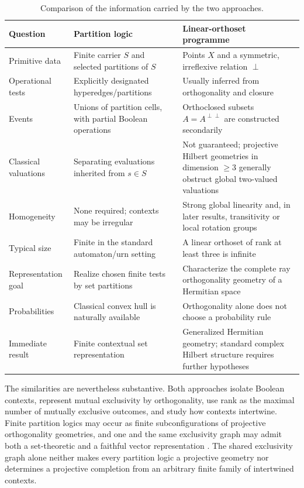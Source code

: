 \documentclass[
  aps,
  pra,
  twocolumn,
  amsmath,
  amssymb,
  longbibliography,
  nofootinbib,
  floatfix
]{revtex4-2}
\begin{document}
\begin{table}
\caption{Comparison of the information carried by the two approaches.}
\label{tab:comparison}
\begin{tabular}{p{}p{}p{}}
\toprule
Question & Partition logic & Linear-orthoset programme\\
\midrule
Primitive data & Finite carrier $S$ and selected partitions of $S$ & Points $X$ and a symmetric, irreflexive relation $\perp$\\
Operational tests & Explicitly designated hyperedges/partitions & Usually inferred from orthogonality and closure\\
Events & Unions of partition cells, with partial Boolean operations & Orthoclosed subsets $A=A^{\perp\perp}$ are constructed secondarily\\
Classical valuations & Separating evaluations inherited from $s\in S$ & Not guaranteed; projective Hilbert geometries in dimension $\ge3$ generally obstruct global two-valued valuations\\
Homogeneity & None required; contexts may be irregular & Strong global linearity and, in later results, transitivity or local rotation groups\\
Typical size & Finite in the standard automaton/urn setting & A linear orthoset of rank at least three is infinite\\
Representation goal & Realize chosen finite tests by set partitions & Characterize the complete ray orthogonality geometry of a Hermitian space\\
Probabilities & Classical convex hull is naturally available & Orthogonality alone does not choose a probability rule\\
Immediate result & Finite contextual set representation & Generalized Hermitian geometry; standard complex Hilbert structure requires further hypotheses
\\\bottomrule
\end{tabular}
\end{table}

The similarities are nevertheless substantive.  Both approaches isolate
Boolean contexts, represent mutual exclusivity by orthogonality, use rank as
the maximal number of mutually exclusive outcomes, and study how contexts
intertwine.  Finite partition logics may occur as finite subconfigurations of
projective orthogonality geometries, and one and the same exclusivity graph may
admit both a set-theoretic and a faithful vector representation
\cite{svozil-2018-b}.  The shared exclusivity graph alone neither makes every
partition logic a projective geometry nor determines a projective completion
from an arbitrary finite family of intertwined contexts.
\end{document}
